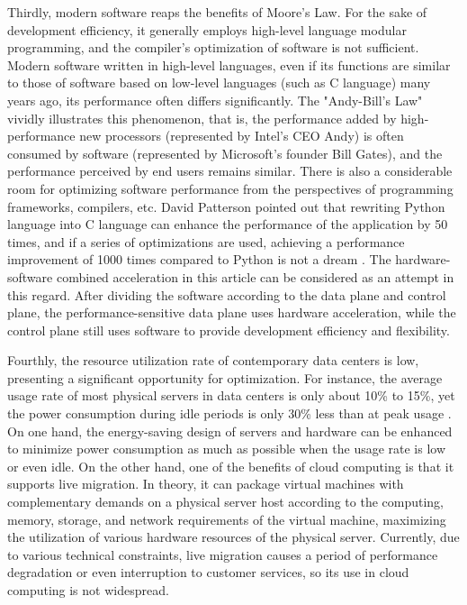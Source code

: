 Thirdly, modern software reaps the benefits of Moore's Law. For the sake of development efficiency, it generally employs high-level language modular programming, and the compiler's optimization of software is not sufficient. Modern software written in high-level languages, even if its functions are similar to those of software based on low-level languages (such as C language) many years ago, its performance often differs significantly. The "Andy-Bill's Law" \cite{langchaozhidian} vividly illustrates this phenomenon, that is, the performance added by high-performance new processors (represented by Intel's CEO Andy) is often consumed by software (represented by Microsoft's founder Bill Gates), and the performance perceived by end users remains similar. There is also a considerable room for optimizing software performance from the perspectives of programming frameworks, compilers, etc. David Patterson pointed out that rewriting Python language into C language can enhance the performance of the application by 50 times, and if a series of optimizations are used, achieving a performance improvement of 1000 times compared to Python is not a dream \cite{python-to-c}. The hardware-software combined acceleration in this article can be considered as an attempt in this regard. After dividing the software according to the data plane and control plane, the performance-sensitive data plane uses hardware acceleration, while the control plane still uses software to provide development efficiency and flexibility.

Fourthly, the resource utilization rate of contemporary data centers is low, presenting a significant opportunity for optimization. For instance, the average usage rate of most physical servers in data centers is only about 10\% to 15\%, yet the power consumption during idle periods is only 30\% less than at peak usage \cite{barroso2018datacenter}. On one hand, the energy-saving design of servers and hardware can be enhanced to minimize power consumption as much as possible when the usage rate is low or even idle. On the other hand, one of the benefits of cloud computing is that it supports live migration. In theory, it can package virtual machines with complementary demands on a physical server host according to the computing, memory, storage, and network requirements of the virtual machine, maximizing the utilization of various hardware resources of the physical server. Currently, due to various technical constraints, live migration causes a period of performance degradation or even interruption to customer services, so its use in cloud computing is not widespread.

